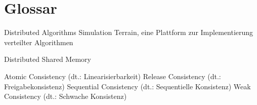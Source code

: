 \chapter{Glossar}

		{Distributed Algorithms Simulation Terrain, eine Plattform zur Implementierung verteilter Algorithmen}

			{Distributed Shared Memory}

			{Atomic Consistency (dt.: Linearisierbarkeit)}
			{Release Consistency (dt.: Freigabekonsistenz)}
			{Sequential Consistency (dt.: Sequentielle Konsistenz)}
			{Weak Consistency (dt.: Schwache Konsistenz)}
